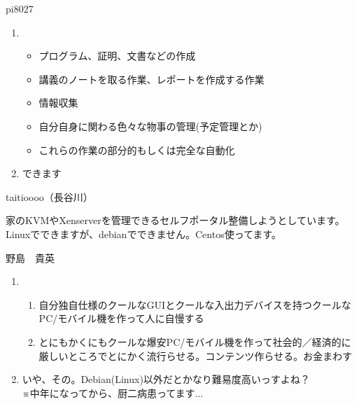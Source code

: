 \begin{prework}{ pi8027 }

\begin{enumerate}
\item \begin{itemize}
\item プログラム、証明、文書などの作成
\item 講義のノートを取る作業、レポートを作成する作業
\item 情報収集
\item 自分自身に関わる色々な物事の管理(予定管理とか)
\item これらの作業の部分的もしくは完全な自動化
\end{itemize}
\item できます
\end{enumerate}

\end{prework}

\begin{prework}{ taitioooo（長谷川） }

家のKVMやXenserverを管理できるセルフポータル整備しようとしています。Linuxでできますが、debianでできません。Centos使ってます。

\end{prework}

\begin{prework}{ 野島　貴英 }

\begin{enumerate}
\item \begin{enumerate}
\item 自分独自仕様のクールなGUIとクールな入出力デバイスを持つクールなPC/モバイル機を作って人に自慢する
\item とにもかくにもクールな爆安PC/モバイル機を作って社会的／経済的に厳しいところでとにかく流行らせる。コンテンツ作らせる。お金まわす
\end{enumerate}
\item いや、その。Debian(Linux)以外だとかなり難易度高いっすよね？\\
※中年になってから、厨二病患ってます...
\end{enumerate}
\end{prework}


